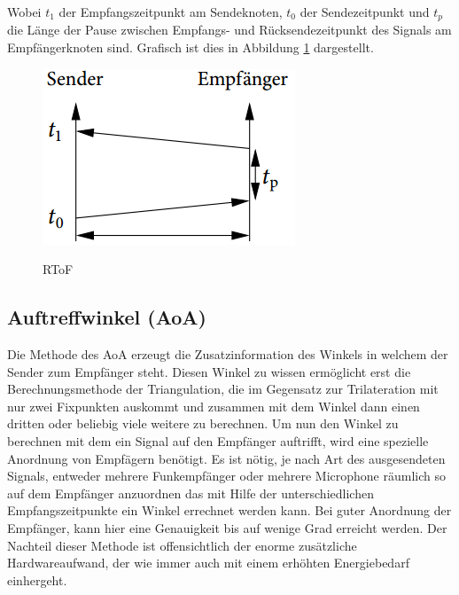 Wobei $t_{1}$ der Empfangszeitpunkt am Sendeknoten, $t_{0}$ der
Sendezeitpunkt und $t_{p}$ die Länge der Pause zwischen Empfangs- und
Rücksendezeitpunkt des Signals am Empfängerknoten sind.
Grafisch ist dies in Abbildung \ref{fig:RToF} dargestellt.

\begin{figure}[h!]
  \centering
  \includegraphics[scale=0.5]{img/time3}
  \label{fig:RToF}
  \caption{RToF}
\end{figure}

\subsection{Auftreffwinkel (AoA)}
Die Methode des \ac{AoA} erzeugt die Zusatzinformation des Winkels in welchem der Sender zum Empfänger steht. Diesen Winkel zu wissen ermöglicht erst die Berechnungsmethode der Triangulation, die im Gegensatz zur Trilateration mit nur zwei Fixpunkten auskommt und zusammen mit dem Winkel dann einen dritten oder beliebig viele weitere zu berechnen. Um nun den Winkel zu berechnen mit dem ein Signal auf den Empfänger auftrifft, wird eine spezielle Anordnung von Empfägern benötigt. Es ist nötig, je nach Art des ausgesendeten Signals, entweder mehrere Funkempfänger oder mehrere Microphone räumlich so auf dem Empfänger anzuordnen das mit Hilfe der unterschiedlichen Empfangszeitpunkte ein Winkel errechnet werden kann. Bei guter Anordnung der Empfänger, kann hier eine Genauigkeit bis auf wenige Grad erreicht werden. Der Nachteil dieser Methode ist offensichtlich der enorme zusätzliche Hardwareaufwand, der wie immer auch mit einem erhöhten Energiebedarf einhergeht. 
